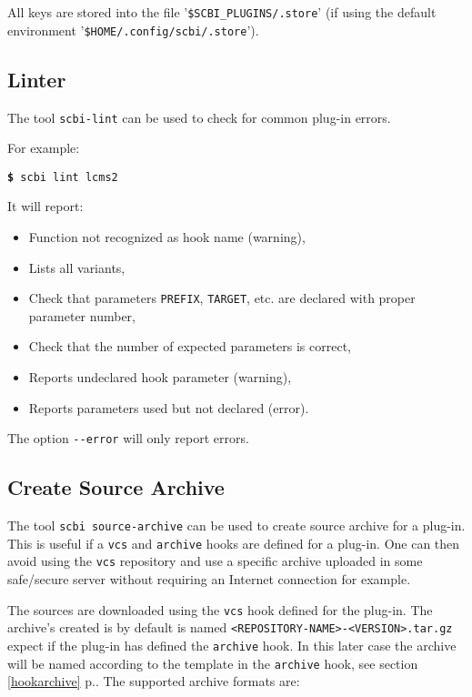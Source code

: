 \documentclass[a4paper,12pt,twoside]{article}
\newcommand{\code}[1]{\texttt{#1}}
\newcommand{\seeref}[1]{see section \ref{#1} p.\pageref{#1}}
\newcommand{\file}[1]{'{\texttt{#1}}'}
\newcommand{\cmd}[1]{\tabto{1cm}\hspace{0.5cm}\texttt{\textbf{\$} #1}}
\newcommand{\ddash}{-{}-}
\begin{document}
All keys are stored into the file \file{\$SCBI\_PLUGINS/.store} (if using the default environment \file{\$HOME/.config/scbi/.store}).

\subsection{Linter}
\label{linter}

The tool \code{scbi-lint} can be used to check for common plug-in errors.

For example:

\cmd{scbi lint lcms2}

It will report:

\begin{itemize}
	\item Function not recognized as hook name (warning),
	\item Lists all variants,
	\item Check that parameters \code{PREFIX}, \code{TARGET}, etc. are declared with proper parameter number,
	\item Check that the number of expected parameters is correct,
	\item Reports undeclared hook parameter (warning),
	\item Reports parameters used but not declared (error).
\end{itemize}

The option \code{\ddash{}error} will only report errors.

\subsection{Create Source Archive}
\label{createsourcearchive}

The tool \code{scbi source-archive} can be used to create source archive for a plug-in. This is useful if a \code{vcs} and \code{archive} hooks are defined for a plug-in. One can then avoid using the \code{vcs} repository and use a specific archive uploaded in some safe/secure server without requiring an Internet connection for example.

The sources are downloaded using the \code{vcs} hook defined for the plug-in. The archive's created is by default is named \code{<REPOSITORY-NAME>-<VERSION>.tar.gz} expect if the plug-in has defined the \code{archive} hook. In this later case the archive will be named according to the template in the \code{archive} hook, \seeref{hookarchive}. The supported archive formats are:
\end{document}

